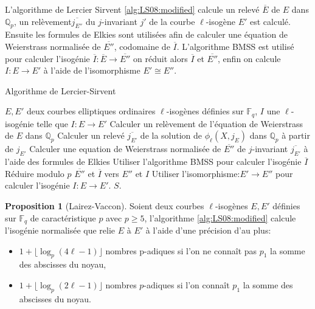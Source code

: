 \documentclass[10pt,a4paper]{book}
\theoremstyle{plain}
\theoremstyle{definition}
\theoremstyle{definition}
\theoremstyle{definition}
\newtheorem{prop}[thm]{Proposition}
\theoremstyle{definition}
\theoremstyle{remark}
\theoremstyle{remark}
\theoremstyle{definition}
\begin{document}
L'algorithme de Lercier Sirvent \ref{alg:LS08:modified} calcule un relevé $\overline{E}$ de $E$ dans $\mathbb{Q}_p$, un relèvement$\overline{j_{E''}}$ du $j$-invariant $j'$ de la courbe $\ell$-isogène $E'$ est calculé. Ensuite les formules de Elkies \cite{elkies1998} sont utilisées afin  de calculer une équation de Weierstrass normalisée de $\overline{E''}$, codomaine de $\overline{I}$. L'algorithme BMSS \cite{BMSS08} est utilisé pour calculer l'isogénie $\overline{I}:\overline{E} \rightarrow \overline{E''}$ on réduit alors $\overline{I}$ et $\overline{E''}$, enfin on calcule $I: E \rightarrow E' $ à l'aide de l'isomorphisme $E' \cong E''$. 

\begin{algorithm}
\caption{\label{alg:LS08:modified} Algorithme de Lercier-Sirvent}
\begin{algorithmic}[1]
\REQUIRE $E,E'$ deux courbes elliptiques ordinaires $\ell$-isogènes définies sur $\mathbb{F}_q$,%
\ENSURE $I$ une $\ell$-isogénie telle que $I:E \rightarrow E'$
\STATE Calculer un relèvement de l'équation de Weierstrass de $E$ dans $\mathbb{Q}_p$
\STATE Calculer un relevé $\overline{j_{E'}}$ de la solution de $\phi_{\ell}(X,j_E)$ dans $\mathbb{Q}_p$ à partir de $j_{E'}$
\STATE Calculer une equation de Weierstrass normalisée de $\overline{E''}$ de $j$-invariant $\overline{j_{E'}}$ à l'aide des formules de Elkies
\STATE Utiliser l'algorithme BMSS pour calculer l'isogénie $\overline{I}$
\STATE Réduire modulo $p$ $\overline{E''}$ et $\overline{I}$ vers $E''$ et $I$
\STATE Utiliser l'isomorphisme:$E' \rightarrow E''$ pour calculer l'isogénie $I: E \rightarrow E'$.
\RETURN$S$. 
\end{algorithmic}
\end{algorithm}

\begin{prop}[Lairez-Vaccon]
Soient deux courbes $\ell$-isogènes $E,E'$ définies sur $\mathbb{F}_q$ de caractéristique $p$ avec $p \geqslant 5$, l'algorithme \ref{alg:LS08:modified} calcule l'isogénie normalisée que relie $E$ à $E'$ à l'aide d'une précision d'au plus: 
\begin{itemize}
\item $ 1 + \lfloor \log_p(4 \ell - 1) \rfloor $ nombres p-adiques si l'on ne connaît pas $p_1$ la somme des abscisses du noyau,
\item  $ 1 + \lfloor \log_p(2 \ell - 1) \rfloor $ nombres $p$-adiques si l'on connaît $p_1$ la somme des abscisses du noyau.
\end{itemize}
\end{prop}
\end{document}
